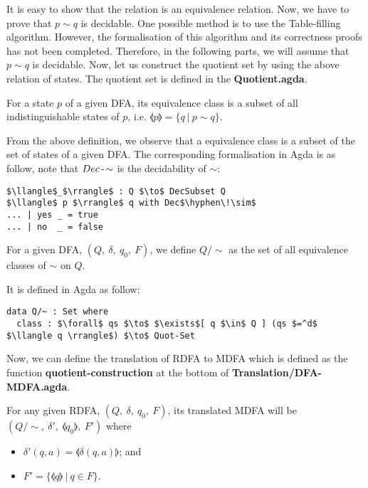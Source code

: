 \par It is easy to show that the relation is an equivalence
relation. Now, we have to prove that \(p \sim q\) is decidable. One
possible method is to use the Table-filling algorithm. However, the
formalisation of this algorithm and its correctness proofs has not
been completed. Therefore, in the following parts, we will assume that
\(p \sim q\) is decidable. Now, let us construct the quotient set by using the above
relation of states. The quotient set is defined in the
\textbf{Quotient.agda}. 

\begin{defn}
\noindent For a state \(p\) of a given DFA, its equivalence
class is a subset of all indistinguishable states of \(p\), i.e. \(\llangle p
\rrangle = \{q\ |\ p \sim q\}\). 
\end{defn}

\par From the above definition, we observe that a equivalence class
is a subset of the set of states of a given DFA. The corresponding formalisation in
Agda is as follow, note that \(Dec\operatorname{-}\!\sim\) is the decidability of
\(\sim\):
\begin{lstlisting}[mathescape=true,xleftmargin=.3\textwidth]
$\llangle$_$\rrangle$ : Q $\to$ DecSubset Q
$\llangle$ p $\rrangle$ q with Dec$\hyphen\!\sim$
... | yes _ = true
... | no  _ = false
\end{lstlisting}

\begin{defn}
\noindent For a given DFA, \((Q,\ \delta,\ q_0,\ F)\), we define
\(Q/\!\sim\) as the set of all equivalence classes of
\(\sim\) on \(Q\). 
\end{defn}

\par It is defined in Agda as follow: 
\begin{lstlisting}[mathescape=true,xleftmargin=.3\textwidth]
data Q/~ : Set where
  class : $\forall$ qs $\to$ $\exists$[ q $\in$ Q ] (qs $=^d$ $\llangle q \rrangle$) $\to$ Quot-Set
\end{lstlisting}

\par Now, we can define the translation of RDFA to MDFA which is
defined as the function \textbf{quotient-construction} at the bottom of \textbf{Translation/DFA-MDFA.agda}. 
\begin{defn}
\label{defn:quotient}
\noindent For any given RDFA, \((Q,\ \delta,\ q_0,\ F)\), its
translated MDFA will be \((Q/\!\sim,\ \delta',\ \llangle q_0 \rrangle,\ F')\) where
\begin{itemize}[nolistsep]
\item \(\delta'(q,a) = \llangle \delta(q,a) \rrangle\); and
\item \(F' = \{\llangle q \rrangle\ |\ q \in F\}\).
\end{itemize}
\end{defn}

